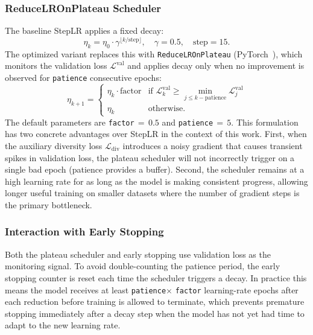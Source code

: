 \documentclass[10pt,conference]{IEEEtran}
\begin{document}
\subsubsection{ReduceLROnPlateau Scheduler}

The baseline StepLR applies a fixed decay:
\begin{equation}
  \eta_k = \eta_0 \cdot \gamma^{\lfloor k / \text{step} \rfloor},
  \quad \gamma = 0.5,\quad \text{step} = 15.
\end{equation}
The optimized variant replaces this with \texttt{ReduceLROnPlateau}
(PyTorch~\cite{pytorch_reducelr}), which monitors the validation loss
$\mathcal{L}^{\mathrm{val}}$ and applies decay only when no improvement is
observed for \texttt{patience} consecutive epochs:
\begin{equation}
  \eta_{k+1} =
  \begin{cases}
    \eta_k \cdot \text{factor} & \text{if } \mathcal{L}^{\mathrm{val}}_{k}
                                  \ge \min_{j \le k-\text{patience}}
                                  \mathcal{L}^{\mathrm{val}}_j \\
    \eta_k & \text{otherwise.}
  \end{cases}
  \label{eq:plateau}
\end{equation}
The default parameters are \texttt{factor}$\,{=}\,0.5$ and
\texttt{patience}$\,{=}\,5$. This formulation has two concrete advantages over
StepLR in the context of this work. First, when the auxiliary diversity loss
$\mathcal{L}_{\mathrm{div}}$ introduces a noisy gradient that causes transient
spikes in validation loss, the plateau scheduler will not incorrectly trigger
on a single bad epoch (patience provides a buffer). Second, the scheduler
remains at a high learning rate for as long as the model is making consistent
progress, allowing longer useful training on smaller datasets where the number
of gradient steps is the primary bottleneck.

\subsubsection{Interaction with Early Stopping}

Both the plateau scheduler and early stopping use validation loss as the
monitoring signal. To avoid double-counting the patience period, the early
stopping counter is reset each time the scheduler triggers a decay. In
practice this means the model receives at least \texttt{patience}$\times$
\texttt{factor} learning-rate epochs after each reduction before training is
allowed to terminate, which prevents premature stopping immediately after a
decay step when the model has not yet had time to adapt to the new learning
rate.
\end{document}
